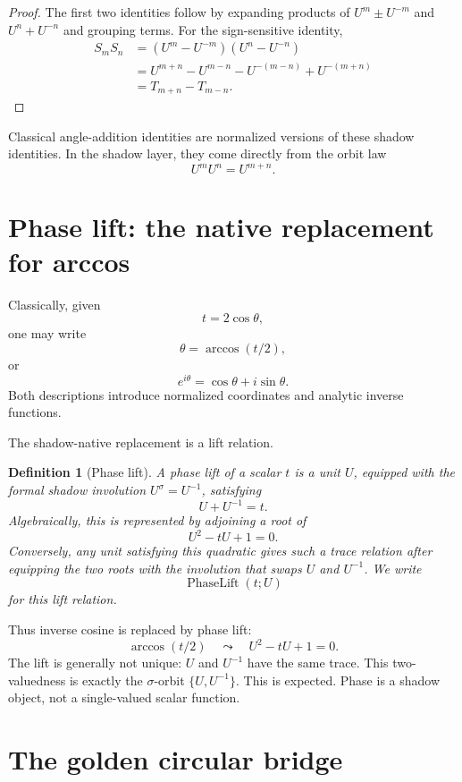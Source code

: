 \documentclass[11pt]{article}
\newtheorem{definition}{Definition}[section]
\newcommand{\Phase}{\operatorname{PhaseLift}}
\newcommand{\sig}{\sigma}
\begin{document}
\begin{proof}
The first two identities follow by expanding products of
$U^m\pm U^{-m}$ and $U^n+U^{-n}$ and grouping terms.  For the sign-sensitive identity,
\[
\begin{aligned}
S_mS_n
&=(U^m-U^{-m})(U^n-U^{-n}) \\
&=U^{m+n}-U^{m-n}-U^{-(m-n)}+U^{-(m+n)} \\
&=T_{m+n}-T_{m-n}.
\end{aligned}
\]
\end{proof}

Classical angle-addition identities are normalized versions of these shadow identities.  In the shadow layer, they come directly from the orbit law
\[
    U^mU^n=U^{m+n}.
\]

\section{Phase lift: the native replacement for arccos}

Classically, given
\[
    t=2\cos\theta,
\]
one may write
\[
    \theta=\arccos(t/2),
\]
or
\[
    e^{i\theta}=\cos\theta+i\sin\theta.
\]
Both descriptions introduce normalized coordinates and analytic inverse functions.

The shadow-native replacement is a lift relation.

\begin{definition}[Phase lift]\label{def:phase-lift}
A phase lift of a scalar $t$ is a unit $U$, equipped with the formal shadow involution $U^\sig=U^{-1}$, satisfying
\[
    U+U^{-1}=t.
\]
Algebraically, this is represented by adjoining a root of
\[
    U^2-tU+1=0.
\]
Conversely, any unit satisfying this quadratic gives such a trace relation after equipping the two roots with the involution that swaps $U$ and $U^{-1}$.  We write
\[
    \Phase(t;U)
\]
for this lift relation.
\end{definition}

Thus inverse cosine is replaced by phase lift:
\[
    \arccos(t/2)
    \quad\leadsto\quad
    U^2-tU+1=0.
\]
The lift is generally not unique: $U$ and $U^{-1}$ have the same trace.  This two-valuedness is exactly the $\sig$-orbit $\{U,U^{-1}\}$.  This is expected.  Phase is a shadow object, not a single-valued scalar function.

\section{The golden circular bridge}
\end{document}
